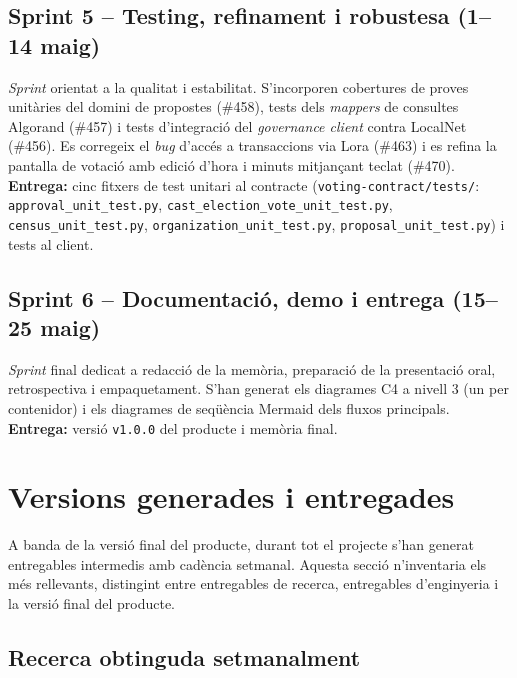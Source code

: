 \subsection{Sprint 5 -- Testing, refinament i robustesa (1--14 maig)}
\label{subsec:sprint-5----testing-refinament-i-robustesa-(1--14-maig)}

\emph{Sprint} orientat a la qualitat i estabilitat.
S'incorporen cobertures de proves unitàries del domini de propostes (\#458), tests dels \emph{mappers} de consultes
Algorand (\#457) i tests d'integració del \emph{governance client} contra LocalNet (\#456).
Es corregeix el \emph{bug} d'accés a transaccions via Lora (\#463) i es refina la pantalla de votació amb edició d'hora
i minuts mitjançant teclat (\#470).
\textbf{Entrega:} cinc fitxers de test unitari al contracte (\texttt{voting-contract/tests/}:
\texttt{approval\_unit\_test.py}, \texttt{cast\_election\_vote\_unit\_test.py}, \texttt{census\_unit\_test.py},
\texttt{organization\_unit\_test.py}, \texttt{proposal\_unit\_test.py}) i tests al client.

\subsection{Sprint 6 -- Documentació, demo i entrega (15--25 maig)}
\label{subsec:sprint-6----documentacio-demo-i-entrega-(15--25-maig)}

\emph{Sprint} final dedicat a redacció de la memòria, preparació de la presentació oral, retrospectiva i empaquetament.
S'han generat els diagrames C4 a nivell 3 (un per contenidor) i els diagrames de seqüència Mermaid dels fluxos
principals.
\textbf{Entrega:} versió \texttt{v1.0.0} del producte i memòria final.



\section{Versions generades i entregades}
\label{sec:versions}

A banda de la versió final del producte, durant tot el projecte s'han generat entregables intermedis amb cadència
setmanal.
Aquesta secció n'inventaria els més rellevants, distingint entre entregables de recerca, entregables d'enginyeria i la
versió final del producte.

\subsection{Recerca obtinguda setmanalment}
\label{subsec:recerca-setmanal}

